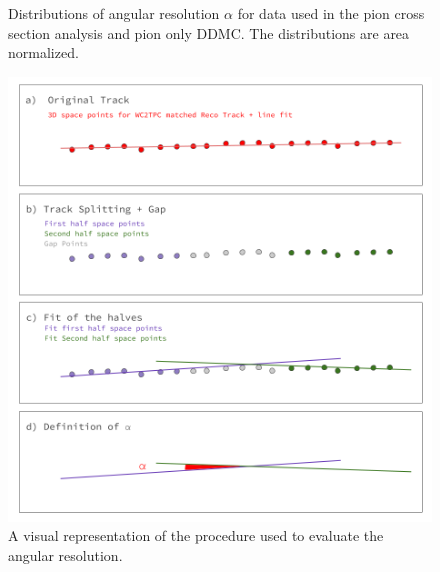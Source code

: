 \begin{figure}[ht]
\begin{minipage}[t]{0.45\linewidth}
\caption[]{Distributions of angular resolution $\alpha$ for data used in the pion cross section analysis and pion only DDMC. The distributions are area normalized. } \label{fig:trackingResolution}
\end{minipage}
\end{figure}




\begin{figure}[ht]
\begin{minipage}[t]{0.45\linewidth}
\centering
\includegraphics[width=\textwidth]{Chapter-5/Images/TrackingProcedure.png}
\caption{A visual representation of the procedure used to evaluate the angular resolution.}
\label{fig:AngResProcedure}
\end{minipage}
\hspace{0.5cm}
\begin{minipage}[t]{0.45\linewidth}
\centering

\end{minipage}
\end{figure}
